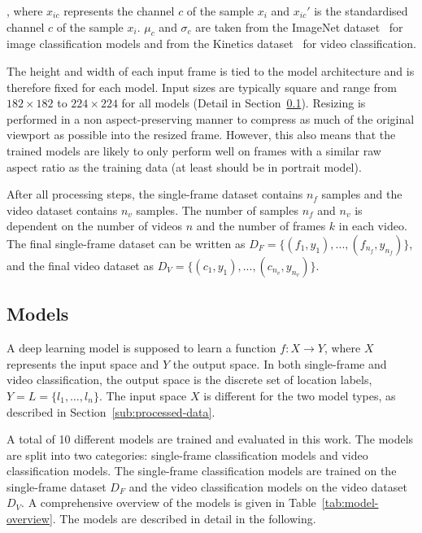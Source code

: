 \documentclass[a4paper]{article}
\begin{document}
, where $x_{ic}$ represents the channel $c$ of the sample $x_i$ and $x_{ic}'$
is the standardised channel $c$ of the sample $x_i$. $\mu_c$ and $\sigma_c$ are
taken from the ImageNet dataset~\cite{imagenet} for image classification
models and from the Kinetics dataset~\cite{kinetics} for video classification.

The height and width of each input frame is tied to the model architecture and
is therefore fixed for each model. Input sizes are typically square and range
from $182 \times 182$ to $224 \times 224$ for all models (Detail in
Section~\ref{sub:models}). Resizing is performed in a non aspect-preserving
manner to compress as much of the original viewport as possible into the
resized frame. However, this also means that the trained models are likely to
only perform well on frames with a similar raw aspect ratio as the training
data (at least should be in portrait model).

After all processing steps, the single-frame dataset contains $n_f$ samples
and the video dataset contains $n_v$ samples. The number of samples $n_f$ and
$n_v$ is dependent on the number of videos $n$ and the number of frames $k$ in
each video. The final single-frame dataset can be written as $D_F = \{(f_1,
y_1), ..., (f_{n_f}, y_{n_f})\}$, and the final video dataset as $D_V =
\{(c_1, y_1), ..., (c_{n_v}, y_{n_v})\}$.




\subsection{Models} %
\label{sub:models}

A deep learning model is supposed to learn a function $f: X \rightarrow Y$,
where $X$ represents the input space and $Y$ the output space. In both
single-frame and video classification, the output space is the discrete set of
location labels, $Y = L = \{l_1, \ldots, l_n\}$. The input space $X$ is
different for the two model types, as described in
Section~\ref{sub:processed-data}. 

A total of 10 different models are trained and evaluated in this work. The
models are split into two categories: single-frame classification models and
video classification models. The single-frame classification models are
trained on the single-frame dataset $D_F$ and the video classification models
on the video dataset $D_V$. A comprehensive overview of the models is given in
Table~\ref{tab:model-overview}. The models are described in detail in the
following.
\end{document}
